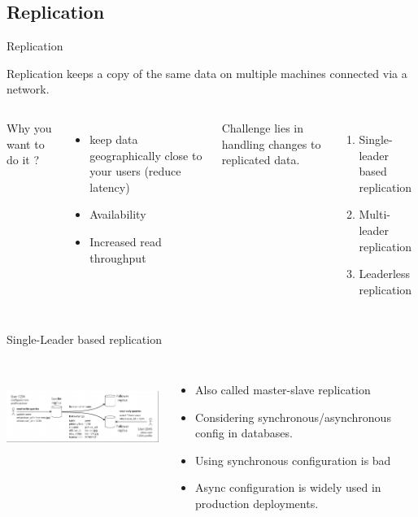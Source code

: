 \documentclass[9pt]{beamer}
\begin{document}
\subsection{Replication}
\begin{frame}{Replication}
  \begin{block}{Replication}
    keeps a copy of the same data on multiple machines connected via a network.
  \end{block}
  
  \begin{columns}
    Why you want to do it ?
    \begin{itemize}
      \pause
    \item keep data geographically close to your users (reduce latency)
      \pause
    \item Availability
      \pause
    \item Increased read throughput
      \pause
    \end{itemize}

    Challenge lies in handling changes to replicated data.
    \begin{enumerate}
      \pause
    \item Single-leader based replication
      \pause
    \item Multi-leader replication
      \pause
    \item Leaderless replication
    \end{enumerate}
  \end{columns}
\end{frame}


\begin{frame}{Single-Leader based replication}
  \begin{columns}
    \includegraphics[width=70mm, height=30mm, scale=0.1]{img/replica/leader_replicatn.png}

    \begin{itemize}
      \item Also called master-slave replication
      \item Considering synchronous/asynchronous config in databases.
      \item Using synchronous configuration is bad
      \item Async configuration is widely used in production deployments.
    \end{itemize}
  \end{columns}
\end{frame}
\end{document}
